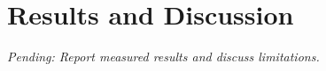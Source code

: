 \section{Results and Discussion}
\textit{Pending: Report measured results and discuss limitations.}
